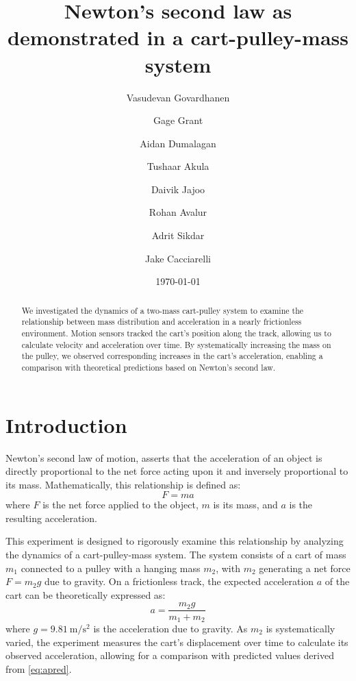 ﻿\documentclass[reprint,amsmath,amssymb,aps]{revtex4-2}
\begin{document}
\title{Newton's second law as demonstrated in a cart-pulley-mass system}

\author{Vasudevan Govardhanen}
\author{Gage Grant}
\author{Aidan Dumalagan}
\author{Tushaar Akula}
\author{Daivik Jajoo}
\author{Rohan Avalur}
\author{Adrit Sikdar}
\author{Jake Cacciarelli}
\date{\today}

\begin{abstract}
We investigated the dynamics of a two-mass cart-pulley system to examine the relationship between mass distribution and acceleration in a nearly frictionless environment. Motion sensors tracked the cart’s position along the track, allowing us to calculate velocity and acceleration over time. By systematically increasing the mass on the pulley, we observed corresponding increases in the cart's acceleration, enabling a comparison with theoretical predictions based on Newton’s second law.
\end{abstract}


\maketitle






\section{Introduction}
Newton's second law of motion, asserts that the acceleration of an object is directly proportional to the net force acting upon it and inversely proportional to its mass. Mathematically, this relationship is defined as:
\begin{equation}
F = ma
\end{equation}
where $F$ is the net force applied to the object, $m$ is its mass, and $a$ is the resulting acceleration.

This experiment is designed to rigorously examine this relationship by analyzing the dynamics of a cart-pulley-mass system. The system consists of a cart of mass $m_1$ connected to a pulley with a hanging mass $m_2$, with $m_2$ generating a net force $F = m_2 g$ due to gravity. On a frictionless track, the expected acceleration $a$ of the cart can be theoretically expressed as:
\begin{equation}
a = \frac{m_2 g}{m_1 + m_2}
\label{eq:apred}
\end{equation}
where $g=\qty{9.81}{\meter\per\second\squared}$ is the acceleration due to gravity. As $m_2$ is systematically varied, the experiment measures the cart's displacement over time to calculate its observed acceleration, allowing for a comparison with predicted values derived from \cref{eq:apred}.
\end{document}
